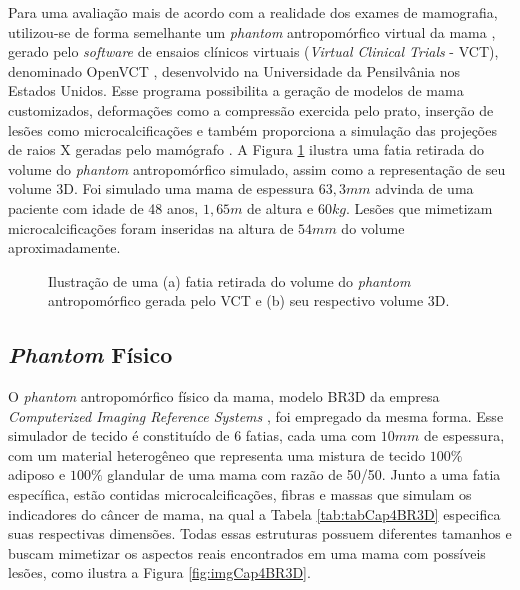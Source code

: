 Para uma avaliação mais de acordo com a realidade dos exames de mamografia, utilizou-se de forma semelhante um \textit{phantom} antropomórfico virtual da mama \cite{bakic2002mammogram1,bakic2002mammogram2,bakic2003mammogram}, gerado pelo \textit{software} de ensaios clínicos virtuais (\textit{Virtual Clinical Trials} - \acs{VCT}), denominado OpenVCT \cite{BakicVCT}, desenvolvido na Universidade da Pensilvânia nos Estados Unidos. Esse programa possibilita a geração de modelos de mama customizados, deformações como a compressão exercida pelo prato, inserção de lesões como microcalcificações e também proporciona a simulação das projeções de raios X geradas pelo mamógrafo \cite{barufaldi2018openvct}. A Figura \ref{fig:imgCap4PhantomVCT} ilustra uma fatia retirada do volume do \textit{phantom} antropomórfico simulado, assim como a representação de seu volume \acs{3D}. Foi simulado uma mama de espessura $63,3mm$ advinda de uma paciente com idade de 48 anos, $1,65m$ de altura e $60kg$. Lesões que mimetizam microcalcificações foram inseridas na altura de $54mm$ do volume aproximadamente. 

\begin{figure}[htb]
	\centering
	
	\caption{Ilustração de uma (a) fatia retirada do volume do \textit{phantom} antropomórfico gerada pelo \acs{VCT} e (b) seu respectivo volume \acs{3D}.}
	
	\hfil
	\hfil

	\label{fig:imgCap4PhantomVCT}
\end{figure}

\subsection{\textit{Phantom} Físico}

 O \textit{phantom} antropomórfico físico da mama, modelo BR3D da empresa \textit{Computerized Imaging Reference Systems} \cite{PhantomBR3D}, foi empregado da mesma forma. Esse simulador de tecido é constituído de 6 fatias, cada uma com $10mm$ de espessura, com um material heterogêneo que representa uma mistura de tecido $100\%$ adiposo e $100\%$ glandular de uma mama com razão de 50/50. Junto a uma fatia específica, estão contidas microcalcificações, fibras e massas que simulam os indicadores do câncer de mama, na qual a Tabela \ref{tab:tabCap4BR3D} especifica suas respectivas dimensões. Todas essas estruturas possuem diferentes tamanhos e buscam mimetizar os aspectos reais encontrados em uma mama com possíveis lesões, como ilustra a Figura \ref{fig:imgCap4BR3D}.
 
